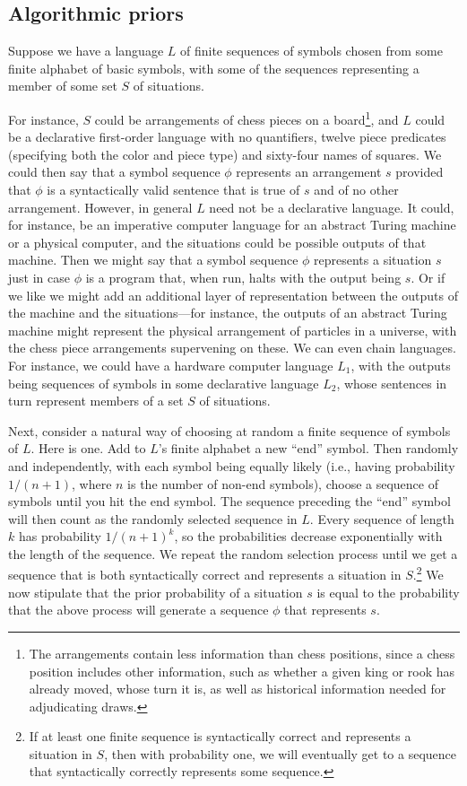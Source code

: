 \subsection{Algorithmic priors}
Suppose we have a language $L$ of finite sequences of symbols chosen from some finite alphabet of basic symbols, 
with some of the sequences representing a member of some set $S$ of situations. 

For instance, $S$ could be arrangements of chess pieces on a board\footnote{The arrangements contain less information
than chess positions, since a chess position includes other information, such as whether a given king or rook has already
moved, whose turn it is, as well as historical information needed for adjudicating draws.}, and $L$ could be a declarative 
first-order language with no quantifiers, twelve piece predicates (specifying both the color and piece type) and sixty-four names of squares.
We could then say that a symbol sequence $\phi$ represents an arrangement $s$ provided that $\phi$ is a 
syntactically valid sentence that is true of $s$ and of no other arrangement. However, in general $L$ need not be a declarative
language. It could, for instance, be an imperative computer language for an abstract Turing machine or a physical computer,
and the situations could be possible outputs of that machine. Then we might say that a symbol sequence $\phi$ represents
a situation $s$ just in case $\phi$ is a program that, when run, halts with the output being $s$. Or if we like we might 
add an additional layer of representation between the outputs of the machine and the situations---for instance, the outputs
of an abstract Turing machine might represent the physical arrangement of particles in a universe, with the chess 
piece arrangements supervening on these.  
We can even chain languages. For instance, we could have a hardware  computer language $L_1$, with the outputs being sequences of
symbols in some declarative language $L_2$, whose sentences in turn represent members of a set $S$ of situations.

Next, consider a natural way of choosing at random a finite sequence of symbols of $L$. Here is one. Add to $L$'s finite alphabet 
a new ``end'' symbol. Then randomly and independently, with each symbol being equally likely (i.e., having probability
$1/(n+1)$, where $n$ is the number of non-end symbols), choose a sequence of
symbols until you hit the end symbol. The sequence preceding the ``end'' symbol will then count as the randomly
selected sequence in $L$. Every sequence of length $k$ has probability $1/(n+1)^k$, so the probabilities decrease 
exponentially with the length of the sequence. We repeat the random selection process until we get a sequence that is both syntactically correct
and represents a situation in $S$.\footnote{If at least one finite sequence is syntactically correct and represents a 
situation in $S$, then with probability one, we will eventually get to a sequence that syntactically correctly represents some 
sequence.}  We now stipulate that the prior probability of a situation $s$ is equal to the probability that the
above process will generate a sequence $\phi$ that represents $s$.

